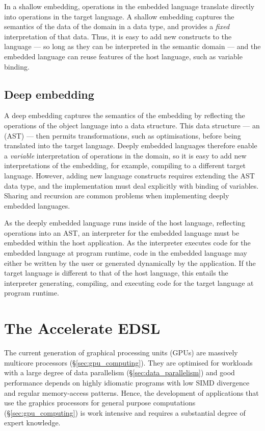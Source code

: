 In a shallow embedding, operations in the embedded language translate directly
into operations in the target language. A shallow embedding captures the
semantics of the data of the domain in a data type, and provides a \emph{fixed}
interpretation of that data. Thus, it is easy to add new constructs to the
language --- so long as they can be interpreted in the semantic domain --- and
the embedded language can reuse features of the host language, such as variable
binding.


\subsection{Deep embedding}

A deep embedding captures the semantics of the embedding by reflecting the
operations of the object language into a data structure. This data structure ---
an  (AST) --- then permits transformations, such as
optimisations, before being translated into the target language. Deeply embedded
languages therefore enable a \emph{variable} interpretation of operations in the
domain, so it is easy to add new interpretations of the embedding, for example,
compiling to a different target language. However, adding new language
constructs requires extending the AST data type, and the implementation must
deal explicitly with binding of variables. Sharing and recursion are common
problems when implementing deeply embedded languages.

As the deeply embedded language runs inside of the host language, reflecting
operations into an AST, an interpreter for the embedded language must be
embedded within the host application.
As the interpreter executes code for the embedded language at program runtime,
code in the embedded language may either be written by the user or generated
dynamically by the application. If the target language is different to that of
the host language, this entails the interpreter generating, compiling, and
executing code for the target language at program runtime.


\section{The Accelerate EDSL}

The current generation of graphical processing units (GPUs) are massively
multicore processors (\S\ref{sec:gpu_computing}). They are optimised for
workloads with a large degree of data parallelism (\S\ref{sec:data_parallelism})
and good performance depends on highly idiomatic programs with low SIMD
divergence and regular memory-access patterns. Hence, the development of
applications that use the graphics processors for general purpose computations
(\S\ref{sec:gpu_computing}) is work intensive and requires a substantial degree
of expert knowledge.

